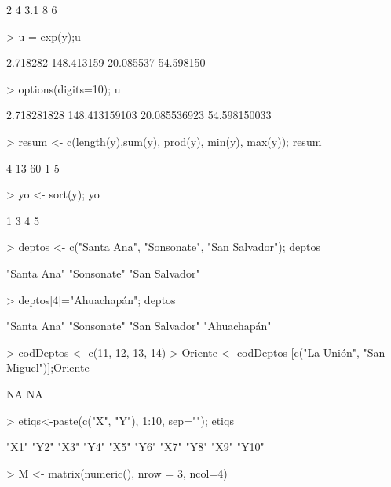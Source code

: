 \documentclass{article}
\begin{document}
\begin{Schunk}
\begin{Soutput}
[1,]    2    4  3.1    8    6
\end{Soutput}
\begin{Sinput}
> u = exp(y);u
\end{Sinput}
\begin{Soutput}
[1]   2.718282 148.413159  20.085537  54.598150
\end{Soutput}
\begin{Sinput}
> options(digits=10); u
\end{Sinput}
\begin{Soutput}
[1]   2.718281828 148.413159103  20.085536923  54.598150033
\end{Soutput}
\begin{Sinput}
> resum <- c(length(y),sum(y), prod(y), min(y), max(y)); resum
\end{Sinput}
\begin{Soutput}
[1]  4 13 60  1  5
\end{Soutput}
\begin{Sinput}
> yo <- sort(y); yo
\end{Sinput}
\begin{Soutput}
[1] 1 3 4 5
\end{Soutput}
\begin{Sinput}
> deptos <- c("Santa Ana", "Sonsonate", "San Salvador"); deptos
\end{Sinput}
\begin{Soutput}
[1] "Santa Ana"    "Sonsonate"    "San Salvador"
\end{Soutput}
\begin{Sinput}
> deptos[4]="Ahuachapán"; deptos
\end{Sinput}
\begin{Soutput}
[1] "Santa Ana"    "Sonsonate"    "San Salvador" "Ahuachapán"  
\end{Soutput}
\begin{Sinput}
> codDeptos <- c(11, 12, 13, 14)
> Oriente <- codDeptos [c("La Unión", "San Miguel")];Oriente
\end{Sinput}
\begin{Soutput}
[1] NA NA
\end{Soutput}
\begin{Sinput}
> etiqs<-paste(c("X", "Y"), 1:10, sep=""); etiqs
\end{Sinput}
\begin{Soutput}
 [1] "X1"  "Y2"  "X3"  "Y4"  "X5"  "Y6"  "X7"  "Y8"  "X9"  "Y10"
\end{Soutput}
\begin{Sinput}
> M <- matrix(numeric(), nrow = 3, ncol=4)

\end{Sinput}
\end{Schunk}
\end{document}
